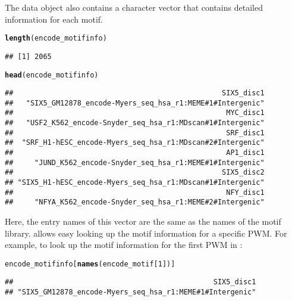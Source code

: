 \documentclass[a4paper,10pt]{article}\usepackage[]{graphicx}\usepackage[]{color}
\makeatletter
\newcommand{\hlnum}[1]{\textcolor[rgb]{0.686,0.059,0.569}{#1}}%
\newcommand{\hlstd}[1]{\textcolor[rgb]{0.345,0.345,0.345}{#1}}%
\newcommand{\hlkwd}[1]{\textcolor[rgb]{0.737,0.353,0.396}{\textbf{#1}}}%
\newenvironment{kframe}{%
 \def\at@end@of@kframe{}%
 \ifinner\ifhmode%
  \def\at@end@of@kframe{\end{minipage}}%
  \begin{minipage}{\columnwidth}%
 \fi\fi%
 \def\FrameCommand##1{\hskip\@totalleftmargin \hskip-\fboxsep
 \colorbox{shadecolor}{##1}\hskip-\fboxsep
     \hskip-\linewidth \hskip-\@totalleftmargin \hskip\columnwidth}%
 \MakeFramed {\advance\hsize-\width
   \@totalleftmargin\z@ \linewidth\hsize
   \@setminipage}}%
 {\par\unskip\endMakeFramed%
 \at@end@of@kframe}
\newenvironment{knitrout}{}{} %
\makeatother
\begin{document}
The data object  also contains a character vector  that contains detailed information for each motif.

\begin{knitrout}
\color{fgcolor}\begin{kframe}
\begin{alltt}
\hlkwd{length}\hlstd{(encode_motifinfo)}
\end{alltt}
\begin{verbatim}
## [1] 2065
\end{verbatim}
\begin{alltt}
\hlkwd{head}\hlstd{(encode_motifinfo)}
\end{alltt}
\begin{verbatim}
##                                                 SIX5_disc1 
##   "SIX5_GM12878_encode-Myers_seq_hsa_r1:MEME#1#Intergenic" 
##                                                  MYC_disc1 
##   "USF2_K562_encode-Snyder_seq_hsa_r1:MDscan#1#Intergenic" 
##                                                  SRF_disc1 
##  "SRF_H1-hESC_encode-Myers_seq_hsa_r1:MDscan#2#Intergenic" 
##                                                  AP1_disc1 
##     "JUND_K562_encode-Snyder_seq_hsa_r1:MEME#1#Intergenic" 
##                                                 SIX5_disc2 
## "SIX5_H1-hESC_encode-Myers_seq_hsa_r1:MDscan#1#Intergenic" 
##                                                  NFY_disc1 
##     "NFYA_K562_encode-Snyder_seq_hsa_r1:MEME#2#Intergenic"
\end{verbatim}
\end{kframe}
\end{knitrout}

Here, the entry names of this vector are the same as the names of the motif library.  allows easy looking up the motif information for a specific PWM. For example, to look up the motif information for the first PWM in :

\begin{knitrout}
\color{fgcolor}\begin{kframe}
\begin{alltt}
\hlstd{encode_motifinfo[}\hlkwd{names}\hlstd{(encode_motif[}\hlnum{1}\hlstd{])]}
\end{alltt}
\begin{verbatim}
##                                               SIX5_disc1 
## "SIX5_GM12878_encode-Myers_seq_hsa_r1:MEME#1#Intergenic"
\end{verbatim}
\end{kframe}
\end{knitrout}
\end{document}

